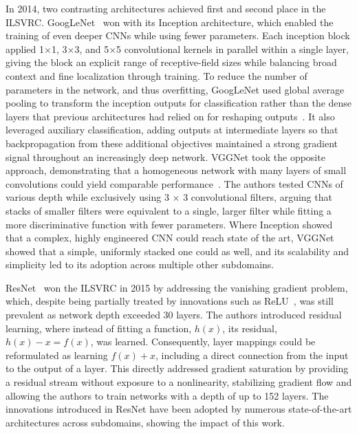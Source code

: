 In 2014, two contrasting architectures achieved first and second place in the ILSVRC. GoogLeNet~\cite{szegedy2015going} won with its Inception architecture, which enabled the training of even deeper CNNs while using fewer parameters. Each inception block applied 1$\times$1, 3$\times$3, and 5$\times$5 convolutional kernels in parallel within a single layer, giving the block an explicit range of receptive-field sizes while balancing broad context and fine localization through training. To reduce the number of parameters in the network, and thus overfitting, GoogLeNet used global average pooling to transform the inception outputs for classification rather than the dense layers that previous architectures had relied on for reshaping outputs~\cite{krizhevsky2012imagenet}. It also leveraged auxiliary classification, adding outputs at intermediate layers so that backpropagation from these additional objectives maintained a strong gradient signal throughout an increasingly deep network. VGGNet took the opposite approach, demonstrating that a homogeneous network with many layers of small convolutions could yield comparable performance~\cite{simonyan2014very}. The authors tested CNNs of various depth while exclusively using 3 $\times$ 3 convolutional filters, arguing that stacks of smaller filters were equivalent to a single, larger filter while fitting a more discriminative function with fewer parameters. Where Inception showed that a complex, highly engineered CNN could reach state of the art, VGGNet showed that a simple, uniformly stacked one could as well, and its scalability and simplicity led to its adoption across multiple other subdomains.

ResNet~\cite{he2016deep} won the ILSVRC in 2015 by addressing the vanishing gradient problem, which, despite being partially treated by innovations such as ReLU~\cite{glorot2011deep}, was still prevalent as network depth exceeded 30 layers. The authors introduced residual learning, where instead of fitting a function, $h(x)$, its residual, $h(x)-x = f(x)$, was learned. Consequently, layer mappings could be reformulated as learning $f(x)+x$, including a direct connection from the input to the output of a layer. This directly addressed gradient saturation by providing a residual stream without exposure to a nonlinearity, stabilizing gradient flow and allowing the authors to train networks with a depth of up to 152 layers. The innovations introduced in ResNet have been adopted by numerous state-of-the-art architectures across subdomains, showing the impact of this work.

